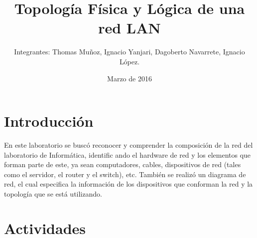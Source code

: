 \documentclass{udpreport}
\title{Topología Física y Lógica de una red LAN}
\author{Integrantes: Thomas Muñoz, Ignacio Yanjari, Dagoberto Navarrete, Ignacio López.}
\date{Marzo de 2016}
\begin{document}
\maketitle
\tableofcontents
\chapter{Introducción}
	        En este laboratorio se buscó reconocer y comprender la composición de la red del laboratorio de Informática, identific
	        ando el hardware de red y los elementos que forman parte de este, ya sean computadores, cables, dispositivos de red 
	        (tales como el servidor, el router y el switch), etc. También se realizó un diagrama de red, el cual especifica la 
	        información de los dispositivos que conforman la red y la topología que se está utilizando.
\chapter{Actividades}
\end{document}

